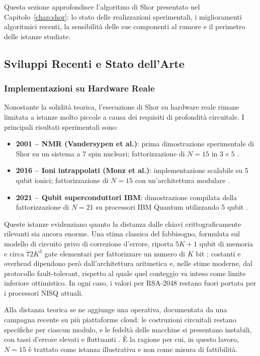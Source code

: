 Questa sezione approfondisce l'algoritmo di Shor presentato nel Capitolo~\ref{chap:shor}: lo stato delle realizzazioni sperimentali, i miglioramenti algoritmici recenti, la sensibilità delle sue componenti al rumore e il perimetro delle istanze studiate.

\subsection{Sviluppi Recenti e Stato dell'Arte}

\subsubsection{Implementazioni su Hardware Reale}

Nonostante la solidità teorica, l'esecuzione di Shor su hardware reale rimane limitata a istanze molto piccole a causa dei requisiti di profondità circuitale. I principali risultati sperimentali sono:

\begin{itemize}
    \item \textbf{2001 -- \ac{NMR} (Vandersypen et al.)}: prima dimostrazione sperimentale di Shor su un sistema a 7 spin nucleari; fattorizzazione di $N = 15$ in $3 \times 5$ \cite{vandersypen2001}.
    \item \textbf{2016 -- Ioni intrappolati (Monz et al.)}: implementazione scalabile su 5 qubit ionici; fattorizzazione di $N = 15$ con un'architettura modulare \cite{monz2016}.
    \item \textbf{2021 -- Qubit superconduttori \ac{IBM}}: dimostrazione compilata della fattorizzazione di $N = 21$ su processori \ac{IBM} Quantum utilizzando 5 qubit \cite{skosana2021}.
\end{itemize}

Queste istanze evidenziano quanto la distanza dalle chiavi crittograficamente rilevanti sia ancora enorme. Una stima classica del fabbisogno, formulata sul modello di circuito privo di correzione d'errore, riporta $5K+1$ qubit di memoria e circa $72K^3$ gate elementari per fattorizzare un numero di $K$ bit \cite{beckman1996}; costanti e overhead dipendono però dall'architettura aritmetica e, nelle stime moderne, dal protocollo fault-tolerant, rispetto al quale quel conteggio va inteso come limite inferiore ottimistico. In ogni caso, i valori per RSA-2048 restano fuori portata per i processori \ac{NISQ} attuali.

Alla distanza teorica se ne aggiunge una operativa, documentata da una campagna recente su più piattaforme cloud: le costruzioni circuitali restano specifiche per ciascun modulo, e le fedeltà delle macchine si presentano instabili, con tassi d'errore elevati e fluttuanti \cite{shor_challenges2025}. È la ragione per cui, in questo lavoro, $N=15$ è trattato come istanza illustrativa e non come misura di fattibilità.

